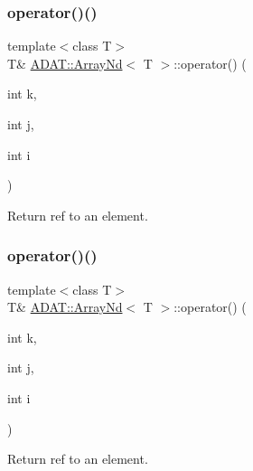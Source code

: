 \mbox{\label{classADAT_1_1ArrayNd_a8c15c0d70203e59f5f746350eb6262a9}} 
\subsubsection{\texorpdfstring{operator()()}{operator()()}\hspace{0.1cm}{\footnotesize\ttfamily [9/16]}}
{\footnotesize\ttfamily template$<$class T$>$ \\
T\& \mbox{\hyperlink{classADAT_1_1ArrayNd}{A\+D\+A\+T\+::\+Array\+Nd}}$<$ T $>$\+::operator() (\begin{DoxyParamCaption}\item[{int}]{k,  }\item[{int}]{j,  }\item[{int}]{i }\end{DoxyParamCaption})\hspace{0.3cm}{\ttfamily [inline]}}



Return ref to an element. 

\mbox{\label{classADAT_1_1ArrayNd_a8c15c0d70203e59f5f746350eb6262a9}} 
\subsubsection{\texorpdfstring{operator()()}{operator()()}\hspace{0.1cm}{\footnotesize\ttfamily [10/16]}}
{\footnotesize\ttfamily template$<$class T$>$ \\
T\& \mbox{\hyperlink{classADAT_1_1ArrayNd}{A\+D\+A\+T\+::\+Array\+Nd}}$<$ T $>$\+::operator() (\begin{DoxyParamCaption}\item[{int}]{k,  }\item[{int}]{j,  }\item[{int}]{i }\end{DoxyParamCaption})\hspace{0.3cm}{\ttfamily [inline]}}



Return ref to an element. 

